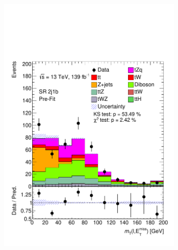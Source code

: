 \begin{figure}[!h]
\begin{subfigure}[b]{0.33\linewidth}
    \includegraphics[width=\linewidth]{ubonn-thesis/Chapters/Chapters_06/Figure/Input_distribution/SR_2j1b_mtW.pdf} 
  \end{subfigure}
  \begin{subfigure}[b]{0.33\linewidth}
    \centering

\end{subfigure}
\end{figure}
